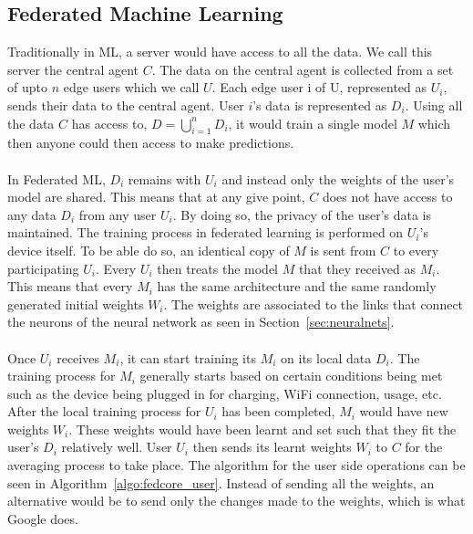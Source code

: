 \documentclass[12pt]{article}
\newcommand{\comment}[1]{}
\begin{document}
\comment{\subsection{Differential Privacy (MIGHT OMIT THIS)}
linkage attacks, netflix and imdb data to identify
only good for large dataset, else bad 
	complex
	easier to do real data and anonymise 

deidentify data (outliers, fields)
 	
want to decouple learning about an individual and learning about the population

analysis output is not dependant on a particular individual and will be the sameif they are not incuded

adjacent dataset
	n+1 and n sized dataset, algo m
}
\subsection{Federated Machine Learning}\label{subsec:fedml}
Traditionally in ML, a server would have access to all the data. We call this server the central agent $C$. The data on the central agent is collected from a set of upto $n$ edge users which we call $U$. Each edge user i of U, represented as $U_i$, sends their data to the central agent. User $i$'s data is represented as $D_i$. Using all the data $C$ has access to, $D = \bigcup_{i=1}^{n} D_i$, it would train a single model $M$ which then anyone could then access to make predictions. 
\\\\
In Federated ML, $D_i$ remains with $U_i$ and instead only the weights of the user's model are shared. This means that at any give point, $C$ does not have access to any data $D_i$ from any user $U_i$. By doing so, the privacy of the user's data is maintained. The training process in federated learning is performed on $U_i$'s device itself. To be able do so, an identical copy of $M$ is sent from $C$ to every participating $U_i$. Every $U_i$ then treats the model $M$ that they received as $M_i$. This means that every $M_i$ has the same architecture and the same randomly generated initial weights $W_i$. The weights are associated to the links that connect the neurons of the neural network as seen in Section~\ref{sec:neuralnets}.
\\\\
Once $U_i$ receives $M_i$, it can start training its $M_i$ on its local data $D_i$. The training process for $M_i$ generally starts based on certain conditions being met such as the device being plugged in for charging, WiFi connection, usage, etc. After the local training process for $U_i$ has been completed, $M_i$ would have new weights $W_i$. These weights would have been learnt and set such that they fit the user's $D_i$ relatively well. User $U_i$ then sends its learnt weights $W_i$ to $C$ for the averaging process to take place. The algorithm for the user side operations can be seen in Algorithm~\ref{algo:fedcore_user}. Instead of sending all the weights, an alternative would be to send only the changes made to the weights, which is what Google does.
\end{document}
